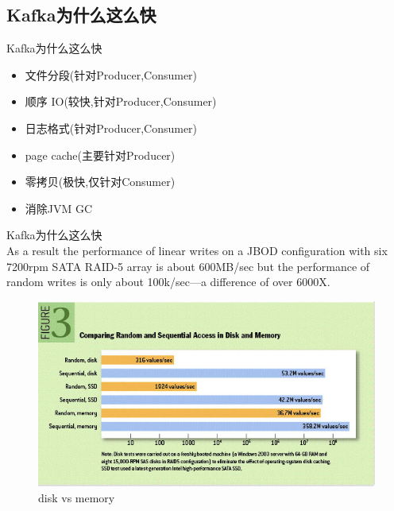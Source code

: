 \subsection{Kafka为什么这么快}
\begin{frame}[plain,t]{Kafka为什么这么快} %
     \\  \vspace{2ex}
    
    \begin{itemize}
        \item 文件分段(针对Producer,Consumer)
        \item 顺序 IO({\color{cyan}较快},针对Producer,Consumer)
        \item 日志格式(针对Producer,Consumer)
        \item page cache(主要针对Producer)%
        \item 零拷贝({\color{red}极快},仅针对Consumer) %
        \item 消除JVM GC
    \end{itemize}


    
\end{frame}
\begin{frame}[plain,t]{Kafka为什么这么快} %
     \\  \vspace{2ex}
    As a result the performance of linear writes on a JBOD configuration with six 7200rpm SATA RAID-5 array is about 600MB/sec but the performance of random writes is only about 100k/sec—a difference of over 6000X.
    \begin{figure}
        \centering
        \includegraphics[width=0.7\linewidth]{image/0406}
        \caption{disk vs memory}
        \label{fig:0406}
    \end{figure}
    
    
    
\end{frame}
